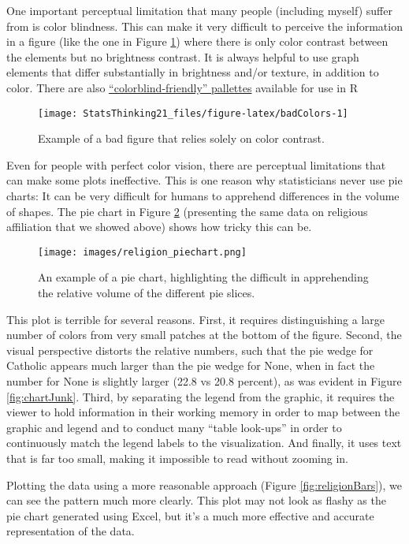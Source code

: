 \documentclass[]{book}
\theoremstyle{definition}
\theoremstyle{definition}
\theoremstyle{definition}
\theoremstyle{remark}
\begin{document}
One important perceptual limitation that many people (including myself)
suffer from is color blindness. This can make it very difficult to
perceive the information in a figure (like the one in Figure
\ref{fig:badColors}) where there is only color contrast between the
elements but no brightness contrast. It is always helpful to use graph
elements that differ substantially in brightness and/or texture, in
addition to color. There are also
\href{http://www.cookbook-r.com/Graphs/Colors_(ggplot2)/\#a-colorblind-friendly-palette}{``colorblind-friendly''
pallettes} available for use in R

\begin{figure}
\texttt{[image: StatsThinking21\_files/figure-latex/badColors-1]} \caption{Example of a bad figure that relies solely on color contrast.}\label{fig:badColors}
\end{figure}

Even for people with perfect color vision, there are perceptual
limitations that can make some plots ineffective. This is one reason why
statisticians never use pie charts: It can be very difficult for humans
to apprehend differences in the volume of shapes. The pie chart in
Figure \ref{fig:pieChart} (presenting the same data on religious
affiliation that we showed above) shows how tricky this can be.

\begin{figure}
\centering
\texttt{[image: images/religion\_piechart.png]}
\caption{\label{fig:pieChart}An example of a pie chart, highlighting the
difficult in apprehending the relative volume of the different pie
slices.}
\end{figure}

This plot is terrible for several reasons. First, it requires
distinguishing a large number of colors from very small patches at the
bottom of the figure. Second, the visual perspective distorts the
relative numbers, such that the pie wedge for Catholic appears much
larger than the pie wedge for None, when in fact the number for None is
slightly larger (22.8 vs 20.8 percent), as was evident in Figure
\ref{fig:chartJunk}. Third, by separating the legend from the graphic,
it requires the viewer to hold information in their working memory in
order to map between the graphic and legend and to conduct many ``table
look-ups'' in order to continuously match the legend labels to the
visualization. And finally, it uses text that is far too small, making
it impossible to read without zooming in.

Plotting the data using a more reasonable approach (Figure
\ref{fig:religionBars}), we can see the pattern much more clearly. This
plot may not look as flashy as the pie chart generated using Excel, but
it's a much more effective and accurate representation of the data.
\end{document}
